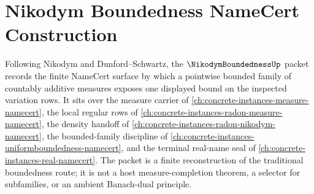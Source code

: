 \chapter{Nikodym Boundedness NameCert Construction}
\label{ch:concrete-instances-nikodym-boundedness-namecert}

Following Nikodym and Dunford--Schwartz, the $\NikodymBoundednessUp$ packet records the finite NameCert surface by which a pointwise bounded family of countably additive measures exposes one displayed bound on the inspected variation rows. It sits over the measure carrier of \autoref{ch:concrete-instances-measure-namecert}, the local regular rows of \autoref{ch:concrete-instances-radon-measure-namecert}, the density handoff of \autoref{ch:concrete-instances-radon-nikodym-namecert}, the bounded-family discipline of \autoref{ch:concrete-instances-uniformboundedness-namecert}, and the terminal real-name seal of \autoref{ch:concrete-instances-real-namecert}. The packet is a finite reconstruction of the traditional boundedness route; it is not a host measure-completion theorem, a selector for subfamilies, or an ambient Banach-dual principle.

